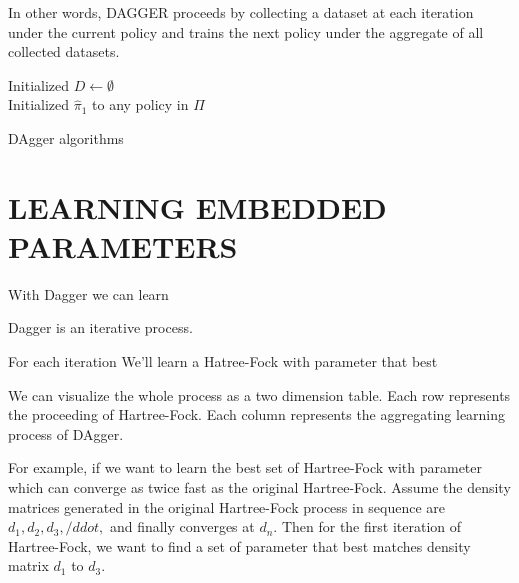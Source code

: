\documentclass[twoside]{article}
\begin{document}
In other words, DAGGER proceeds by collecting a dataset
at each iteration under the current policy and trains the next policy under the aggregate of all collected datasets. 




\begin{algorithm}[htb]
 \KwData{}
 Initialized $D \leftarrow \emptyset$ \\
 Initialized $\hat{\pi}_1$ to any policy in $\Pi$ \\
 \caption{DAgger algorithms}
\end{algorithm}


\section{LEARNING EMBEDDED PARAMETERS}

With Dagger we can learn 

Dagger is an iterative process.

For each iteration We'll learn a Hatree-Fock with parameter that best 

We can visualize the whole process as a two dimension table.
Each row represents the proceeding of Hartree-Fock.
Each column represents the aggregating learning process of DAgger.

For example, if we want to learn the best set of Hartree-Fock with parameter which can converge as twice fast as the original Hartree-Fock.
Assume the density matrices generated in the original Hartree-Fock process in sequence are  $d_1, d_2, d_3, /ddot,$ and finally converges at $d_n$.
Then for the first iteration of Hartree-Fock, we want to find a set of parameter that best matches density matrix $d_1$ to $d_3$.
\end{document}
